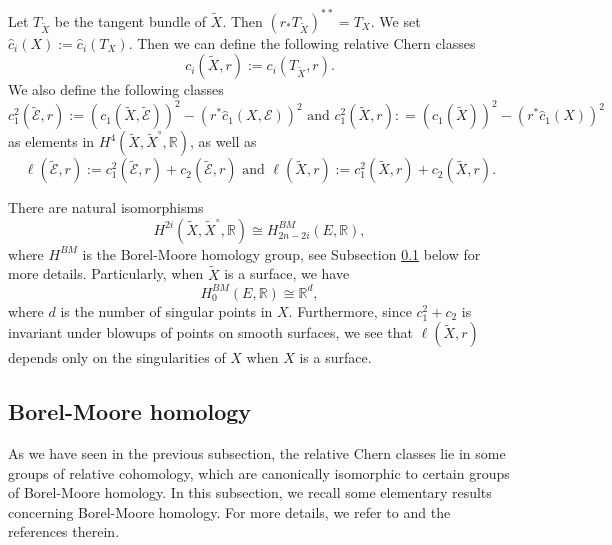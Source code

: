 \documentclass[12pt]{amsart}
\newcommand{\<}{\leq}
\def\mcE{\mathcal{E}}
\theoremstyle{remark}
\theoremstyle{definition}
\theoremstyle{definition}
\numberwithin{equation}{section}
\theoremstyle{definition}
\theoremstyle{definition}
\begin{document}
Let $T_{\widetilde{X}}$ be the tangent bundle of $\widetilde{X}$. 
Then $(r_*T_{\widetilde{X}})^{**}=T_X$. 
We set  $\hat{c}_i(X) := \hat{c}_{i}(T_X)$. 
Then  we can define the following relative Chern classes  
\begin{equation}\label{eqn:relative-class-T}
    c_i(\widetilde{X},r):=c_i(T_{\widetilde{X}}, r).
\end{equation}
We also define the following classes
\begin{equation*}
    \label{eqn:c1-square}
    c_1^2(\widetilde{\mcE},r)  := (c_1(\widetilde{X},\widetilde{\mcE}))^2-(r^*\hat{c}_1(X,\mcE))^2 \mbox{ and }
c_1^2(\widetilde{X},r)  : = (c_1(\widetilde{X}))^2-(r^*\hat{c}_1(X))^2  
\end{equation*}
as elements  in $H^4(\widetilde{X},  \widetilde{X}^\circ, \mathbb{R})$, as well as 
\begin{equation}\label{eqn:l-function}
     \ell(\widetilde{\mcE},r):= c_1^2(\widetilde{\mcE},r) + c_2(\widetilde{\mcE},r)  
\mbox{ and }
\ell(\widetilde{X},r):= c_1^2(\widetilde{X},r) + c_2(\widetilde{X},r).
\end{equation}
 
   

There  are natural isomorphisms 
\[
H^{2i}(\widetilde{X},  \widetilde{X}^\circ, \mathbb{R}) \cong H^{BM}_{2n-2i}(E, \mathbb{R}),
\]
where  $H^{BM}$ is the Borel-Moore homology group, see Subsection \ref{subsec:BM-homology} below for more details.  
Particularly, when $\widetilde{X}$  is a surface, we have 
\[  H^{BM}_{0}(E, \mathbb{R}) \cong \mathbb{R}^d,\]
where $d$ is the number of singular points in $X$. 
Furthermore, since $c_1^2  + c_2$ is  invariant under blowups of points on smooth surfaces, we see that 
$\ell(\widetilde{X},r)$ depends only on the singularities of $X$ when $X$ is a surface. 



  




\subsection{Borel-Moore homology}\label{subsec:BM-homology}
As we have seen in the previous subsection, the relative Chern classes lie in some groups of relative cohomology, which are canonically isomorphic to certain groups of Borel-Moore homology. 
In this subsection, 
we recall some elementary results concerning Borel-Moore homology.  
For more details, we refer to \cite[Chapter 19]{Fulton} and the references therein. 
\end{document}
